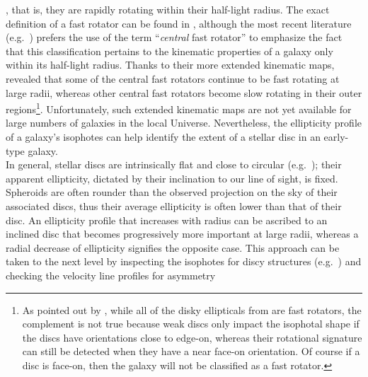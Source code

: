 \documentclass[useAMS,usenatbib,article]{mnras}
\begin{document}
{\citep{atlas3dIII,scott2014}, 
that is, they are rapidly rotating within their half-light radius. 
The exact definition of a fast rotator can be found in \cite{emsellem2007}, 
although the most recent literature (e.g.~\citealt{arnold2011n3115,romanowskyfall2012,arnold2014}) 
prefers the use of the term ``\emph{central} fast rotator'' 
to emphasize the fact that this classification pertains to the kinematic properties of a galaxy only within its half-light radius.
Thanks to their more extended kinematic maps, 
\cite{arnold2014} revealed that some of the central fast rotators continue to be fast rotating at large radii, 
whereas other central fast rotators become slow rotating in their outer regions\footnote{As pointed out by \cite{cappellari2011}, 
while all of the disky ellipticals from \cite{Bender1994} are fast rotators, 
the complement is not true because weak discs only impact the isophotal shape if the discs have orientations close to edge-on, 
whereas their rotational signature can still be detected when they have a near face-on orientation.  
Of course if a disc is face-on, then the galaxy will not be classified as a fast rotator. }.
Unfortunately, such extended kinematic maps are not yet available for large numbers of galaxies in the local Universe. 
Nevertheless, the ellipticity profile of a galaxy's isophotes can help identify the extent of a stellar disc in an early-type galaxy. \\
In general, stellar discs are intrinsically flat and close to circular (e.g.~\citealt{Andersen2001,AndersenBershady2002}); 
their apparent ellipticity, dictated by their inclination to our line of sight, is fixed. 
Spheroids are often rounder than the observed projection on the sky of their associated discs, 
thus their average ellipticity is often lower than that of their disc. 
An ellipticity profile that increases with radius can be ascribed to an inclined disc that becomes progressively more important at large radii, 
whereas a radial decrease of ellipticity signifies the opposite case. 
This approach can be taken to the next level by inspecting the isophotes for discy structures 
(e.g.~\citealt{carter1978,carter1987,capaccioli1987,jedrzejewski1987,BenderMoellenhoff1987}) 
and checking the velocity line profiles for asymmetry 
}
\end{document}
